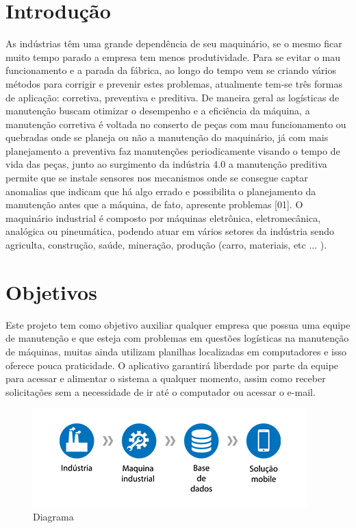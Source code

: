 \documentclass[%
  a4paper,%
  12pt,%
  english,%
  brazilian,%
]{article}
\begin{document}
\section{Introdução}%
As indústrias têm uma grande dependência de seu maquinário, se o mesmo ficar muito tempo parado a empresa tem menos produtividade. Para se evitar o mau funcionamento e a parada da fábrica, ao longo do tempo vem se criando vários métodos para corrigir e prevenir estes problemas, atualmente tem-se três formas de aplicação: corretiva, preventiva e preditiva. De maneira geral as logísticas de manutenção buscam otimizar o desempenho e a eficiência da máquina, a manutenção corretiva é voltada no conserto de peças com mau funcionamento ou quebradas onde se planeja ou não a manutenção do maquinário, já com mais planejamento a preventiva faz manutenções periodicamente visando o tempo de vida das peças, junto ao surgimento da indústria 4.0 a manutenção preditiva permite que se instale sensores nos mecanismos onde se consegue captar anomalias que indicam que há algo errado e possibilita o planejamento da manutenção antes que a máquina, de fato, apresente problemas [01]. O maquinário industrial é composto por máquinas eletrônica, eletromecânica, analógica ou pineumática, podendo atuar em vários setores da indústria sendo agriculta, construção, saúde, mineração, produção (carro, materiais, etc ... ).

\section{Objetivos}%
Este projeto tem como objetivo auxiliar qualquer empresa que possua uma equipe de manutenção e que esteja com problemas em questões logísticas na manutenção de máquinas, muitas ainda utilizam planilhas localizadas em computadores e isso oferece pouca praticidade. O aplicativo garantirá liberdade por parte da equipe para acessar e alimentar o sistema a qualquer momento, assim como receber solicitações sem a necessidade de ir até o computador ou acessar o e-mail.



\begin{figure}[!htb]
\includegraphics[width = 0.95\linewidth]{Figures/1.png}
\caption{Diagrama}%
\end{figure}
\end{document}
